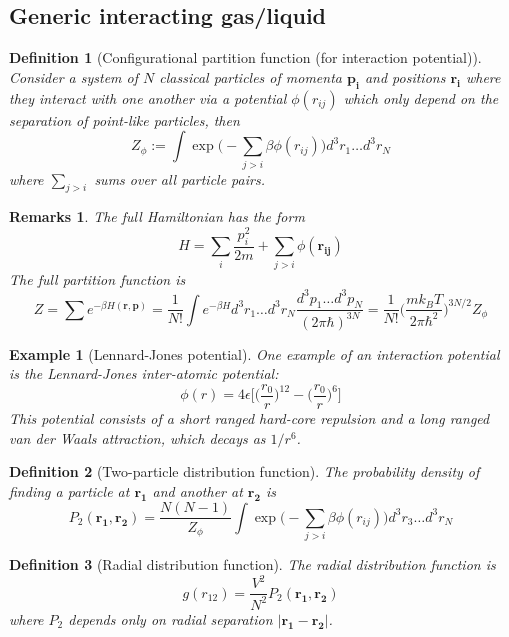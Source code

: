 \documentclass[a4paper]{article}
\newtheorem{eg}{Example}[section]
\newtheorem{remarks}{Remarks}[section]
\theoremstyle{new}
\newtheorem{defi}{Definition}[section]
\begin{document}
\subsection{Generic interacting gas/liquid}
\begin{defi}[Configurational partition function (for interaction potential)]
Consider a system of $N$ classical particles of momenta $\mathbf{p_i}$ and positions $\mathbf{r_i}$ where they interact with one another via a potential $\phi(r_{ij})$ which only depend on the separation of point-like particles, then
\begin{equation}
Z_\phi:=\int\exp\bigg(-\sum_{j>i}\beta\phi(r_{ij})\bigg)d^3r_1\dots d^3r_N\label{configpartition}
\end{equation}
where $\sum_{j>i}$ sums over all particle pairs. 
\end{defi}
\begin{remarks}
The full Hamiltonian has the form
$$H=\sum_i\frac{p_i^2}{2m}+\sum_{j>i}\phi(\mathbf{r_{ij}})$$
The full partition function is
$$Z=\sum e^{-\beta H(\mathbf{r},\mathbf{p})}=\frac{1}{N!}\int e^{-\beta H}d^3r_1\dots d^3r_N\frac{d^3p_1\dots d^3p_N}{(2\pi\hbar)^{3N}}=\frac{1}{N!}\bigg(\frac{mk_BT}{2\pi\hbar^2}\bigg)^{3N/2}Z_\phi$$
\end{remarks}
\begin{eg}[Lennard-Jones potential]
One example of an interaction potential is the Lennard-Jones inter-atomic potential:
$$\phi(r)=4\epsilon\bigg[\bigg(\frac{r_0}{r}\bigg)^{12}-\bigg(\frac{r_0}{r}\bigg)^6\bigg]$$
This potential consists of a short ranged hard-core repulsion and a long ranged van der Waals attraction, which decays as $1/r^6$.
\end{eg}
\begin{defi}[Two-particle distribution function]
The probability density of finding a particle at $\mathbf{r_1}$ and another at $\mathbf{r_2}$ is
\begin{equation}
P_2(\mathbf{r_1},\mathbf{r_2})=\frac{N(N-1)}{Z_\phi}\int\exp\bigg(-\sum_{j>i}\beta\phi(r_{ij})\bigg)d^3r_3\dots d^3r_N\label{distr}
\end{equation}
\end{defi}
\begin{defi}[Radial distribution function]
The radial distribution function is
\begin{equation}
g(r_{12})=\frac{V^2}{N^2}P_2(\mathbf{r_1},\mathbf{r_2})\label{distr2}
\end{equation}
where $P_2$ depends only on radial separation $|\mathbf{r_1}-\mathbf{r_2}|$.
\end{defi}
\end{document}
